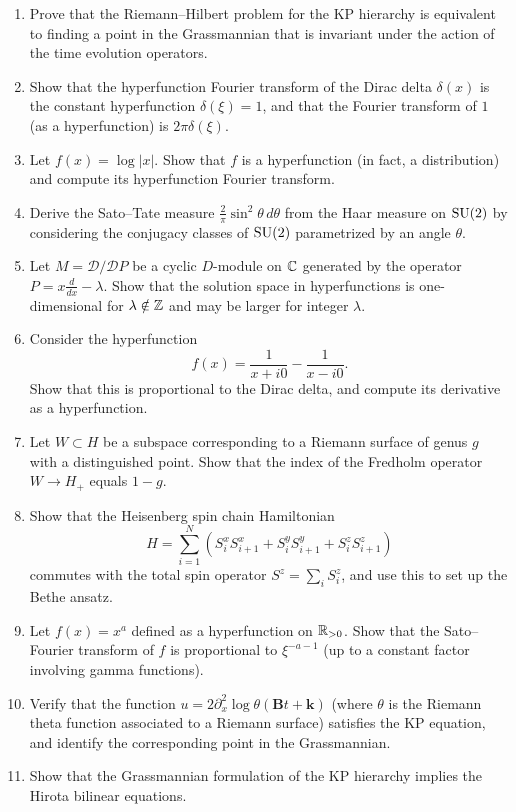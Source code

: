 \begin{enumerate}
    \item [A] Prove that the Riemann--Hilbert problem for the KP hierarchy is equivalent to finding a point in the Grassmannian that is invariant under the action of the time evolution operators.
    
    \item [B] Show that the hyperfunction Fourier transform of the Dirac delta \(\delta(x)\) is the constant hyperfunction \(\hat{\delta}(\xi) = 1\), and that the Fourier transform of \(1\) (as a hyperfunction) is \(2\pi \delta(\xi)\).
    
    \item [I] Let \(f(x) = \log|x|\). Show that \(f\) is a hyperfunction (in fact, a distribution) and compute its hyperfunction Fourier transform.
    
    \item [I] Derive the Sato--Tate measure \(\frac{2}{\pi} \sin^2 \theta \, d\theta\) from the Haar measure on \(\operatorname{SU}(2)\) by considering the conjugacy classes of \(\operatorname{SU}(2)\) parametrized by an angle \(\theta\).
    
    \item [A] Let \(M = \mathcal{D}/ \mathcal{D}P\) be a cyclic \(D\)-module on \(\mathbb{C}\) generated by the operator \(P = x\frac{d}{dx} - \lambda\). Show that the solution space in hyperfunctions is one-dimensional for \(\lambda \notin \mathbb{Z}\) and may be larger for integer \(\lambda\).
    
    \item [B] Consider the hyperfunction
    \[
    f(x) = \frac{1}{x + i0} - \frac{1}{x - i0}.
    \]
    Show that this is proportional to the Dirac delta, and compute its derivative as a hyperfunction.
    
    \item [A] Let \(W \subset H\) be a subspace corresponding to a Riemann surface of genus \(g\) with a distinguished point. Show that the index of the Fredholm operator \(W \to H_+\) equals \(1-g\).
    
    \item [I] Show that the Heisenberg spin chain Hamiltonian
    \[
    H = \sum_{i=1}^N \left( S_i^x S_{i+1}^x + S_i^y S_{i+1}^y + S_i^z S_{i+1}^z \right)
    \]
    commutes with the total spin operator \(S^z = \sum_i S_i^z\), and use this to set up the Bethe ansatz.
    
    \item [I] Let \(f(x) = x^a\) defined as a hyperfunction on \(\mathbb{R}_{>0}\). Show that the Sato--Fourier transform of \(f\) is proportional to \(\xi^{-a-1}\) (up to a constant factor involving gamma functions).
    
    \item [A] Verify that the function \(u = 2 \partial_x^2 \log \theta(\mathbf{B}t + \mathbf{k})\) (where \(\theta\) is the Riemann theta function associated to a Riemann surface) satisfies the KP equation, and identify the corresponding point in the Grassmannian.
    
    \item [I] Show that the Grassmannian formulation of the KP hierarchy implies the Hirota bilinear equations.
\end{enumerate}

